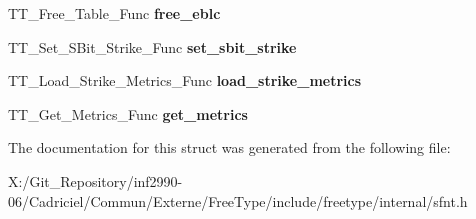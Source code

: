 \begin{DoxyCompactItemize}
\item 
\hypertarget{struct_s_f_n_t___interface___a043a22a8dd45b30dc6e8e5cb7be8dc44}{T\-T\-\_\-\-Free\-\_\-\-Table\-\_\-\-Func {\bfseries free\-\_\-eblc}}\label{struct_s_f_n_t___interface___a043a22a8dd45b30dc6e8e5cb7be8dc44}

\item 
\hypertarget{struct_s_f_n_t___interface___ab9e73d79753ea4a492c1cf66aee8e518}{T\-T\-\_\-\-Set\-\_\-\-S\-Bit\-\_\-\-Strike\-\_\-\-Func {\bfseries set\-\_\-sbit\-\_\-strike}}\label{struct_s_f_n_t___interface___ab9e73d79753ea4a492c1cf66aee8e518}

\item 
\hypertarget{struct_s_f_n_t___interface___a285149d0d4f00f2b862e3db45205cfa0}{T\-T\-\_\-\-Load\-\_\-\-Strike\-\_\-\-Metrics\-\_\-\-Func {\bfseries load\-\_\-strike\-\_\-metrics}}\label{struct_s_f_n_t___interface___a285149d0d4f00f2b862e3db45205cfa0}

\item 
\hypertarget{struct_s_f_n_t___interface___a32ceff5842782c1cf7d7992e40cc858e}{T\-T\-\_\-\-Get\-\_\-\-Metrics\-\_\-\-Func {\bfseries get\-\_\-metrics}}\label{struct_s_f_n_t___interface___a32ceff5842782c1cf7d7992e40cc858e}

\end{DoxyCompactItemize}


The documentation for this struct was generated from the following file\-:\begin{DoxyCompactItemize}
\item 
X\-:/\-Git\-\_\-\-Repository/inf2990-\/06/\-Cadriciel/\-Commun/\-Externe/\-Free\-Type/include/freetype/internal/sfnt.\-h\end{DoxyCompactItemize}
